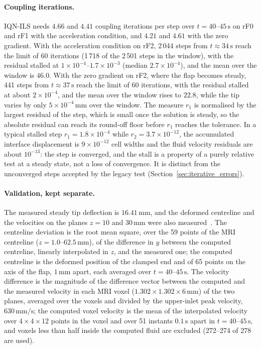 \paragraph{Coupling iterations.}
IQN-ILS needs $4.66$ and $4.41$ coupling iterations per step over $t = 40$--$45\,\mathrm{s}$ on rF0 and rF1 with the acceleration condition, and $4.21$ and $4.61$ with the zero gradient.
With the acceleration condition on rF2, 2\,044 steps from $t \approx 34\,\mathrm{s}$ reach the limit of 60 iterations (1\,718 of the 2\,501 steps in the window), with the residual stalled at $1\times10^{-4}$--$1.7\times10^{-3}$ (median $2.7\times10^{-4}$), and the mean over the window is $46.0$.
With the zero gradient on rF2, where the flap becomes steady, 441 steps from $t \approx 37\,\mathrm{s}$ reach the limit of 60 iterations, with the residual stalled at about $2\times10^{-4}$, and the mean over the window rises to $22.8$, while the tip varies by only $5\times10^{-4}\,\mathrm{mm}$ over the window.
The measure $r_1$ is normalised by the largest residual of the step, which is small once the solution is steady, so the absolute residual can reach its round-off floor before $r_1$ reaches the tolerance. In a typical stalled step $r_1 = 1.8\times10^{-4}$ while $r_2 = 3.7\times10^{-12}$, the accumulated interface displacement is $9\times10^{-12}$ cell widths and the fluid velocity residuals are about $10^{-13}$: the step is converged, and the stall is a property of a purely relative test at a steady state, not a loss of convergence. It is distinct from the unconverged steps accepted by the legacy test (Section~\ref{sec:iterative_errors}).

\paragraph{Validation, kept separate.}
The measured steady tip deflection is $16.41\,\mathrm{mm}$, and the deformed centreline and the velocities on the planes $z = 10$ and $30\,\mathrm{mm}$ were also measured~\citep{Hessenthaler2017a}.
The centreline deviation is the root mean square, over the 59 points of the MRI centreline ($z = 1.0$--$62.5\,\mathrm{mm}$), of the difference in $y$ between the computed centreline, linearly interpolated in $z$, and the measured one; the computed centreline is the deformed position of the clamped end and of 65 points on the axis of the flap, $1\,\mathrm{mm}$ apart, each averaged over $t = 40$--$45\,\mathrm{s}$.
The velocity difference is the magnitude of the difference vector between the computed and the measured velocity in each MRI voxel ($1.302 \times 1.302 \times 6\,\mathrm{mm}$) of the two planes, averaged over the voxels and divided by the upper-inlet peak velocity, $630\,\mathrm{mm/s}$; the computed voxel velocity is the mean of the interpolated velocity over $4 \times 4 \times 12$ points in the voxel and over 51 instants $0.1\,\mathrm{s}$ apart in $t = 40$--$45\,\mathrm{s}$, and voxels less than half inside the computed fluid are excluded (272--274 of 278 are used).

